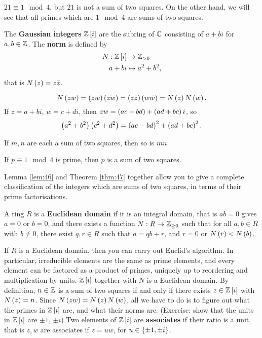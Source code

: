 \begin{example2}
$ 21 \equiv 1 \mod 4 $, but $ 21 $ is not a sum of two squares. On the other hand, we will see that all primes which are $ 1 \mod 4 $ are sums of two squares.
\end{example2}

\begin{definition}
The \textbf{Gaussian integers} $ \mathbb{Z}\left[ i \right] $ are the subring of $ \mathbb{C} $ consisting of $ a + bi $ for $ a, b \in \mathbb{Z} $. The \textbf{norm} is defined by
\begin{align*}
N : \mathbb{Z}\left[ i \right] & \to \mathbb{Z}_{> 0} \\
a + bi & \mapsto a^2 + b^2,
\end{align*}
that is $ N\left( z \right) = z\bar{z} $.
\end{definition}

$$ N\left( zw \right) = \left( zw \right)\left( \bar{zw} \right) = \left( z\bar{z} \right)\left( w\bar{w} \right) = N\left( z \right)N\left( w \right). $$
If $ z = a + bi $, $ w = c + di $, then $ zw = \left( ac - bd \right) + \left( ad + bc \right)i $, so
$$ \left( a^2 + b^2 \right)\left( c^2 + d^2 \right) = \left( ac - bd \right)^2 + \left( ad + bc \right)^2. $$

\begin{lemma}
\label{lem:46}
If $ m, n $ are each a sum of two squares, then so is $ mn $.
\end{lemma}

\begin{theorem}
\label{thm:47}
If $ p \equiv 1 \mod 4 $ is prime, then $ p $ is a sum of two squares.
\end{theorem}

Lemma \ref{lem:46} and Theorem \ref{thm:47} together allow you to give a complete classification of the integers which are sums of two squares, in terms of their prime factorisations.

\begin{definition}
A ring $ R $ is a \textbf{Euclidean domain} if it is an integral domain, that is $ ab = 0 $ gives $ a = 0 $ or $ b = 0 $, and there exists a function $ N : R \to \mathbb{Z}_{\ge 0} $ such that for all $ a, b \in R $ with $ b \ne 0 $, there exist $ q, r \in R $ such that $ a = qb + r $, and $ r = 0 $ or $ N\left( r \right) < N\left( b \right) $.
\end{definition}

If $ R $ is a Euclidean domain, then you can carry out Euclid's algorithm. In particular, irreducible elements are the same as prime elements, and every element can be factored as a product of primes, uniquely up to reordering and multiplication by units. $ \mathbb{Z}\left[ i \right] $ together with $ N $ is a Euclidean domain. By definition, $ n \in \mathbb{Z} $ is a sum of two squares if and only if there exists $ z \in \mathbb{Z}\left[ i \right] $ with $ N\left( z \right) = n $. Since $ N\left( zw \right) = N\left( z \right)N\left( w \right) $, all we have to do is to figure out what the primes in $ \mathbb{Z}\left[ i \right] $ are, and what their norms are. (Exercise: show that the units in $ \mathbb{Z}\left[ i \right] $ are $ \pm 1 $, $ \pm i $) Two elements of $ \mathbb{Z}\left[ i \right] $ are \textbf{associates} if their ratio is a unit, that is $ z, w $ are associates if $ z = uw $, for $ u \in \left\{ \pm 1, \pm i \right\} $.

